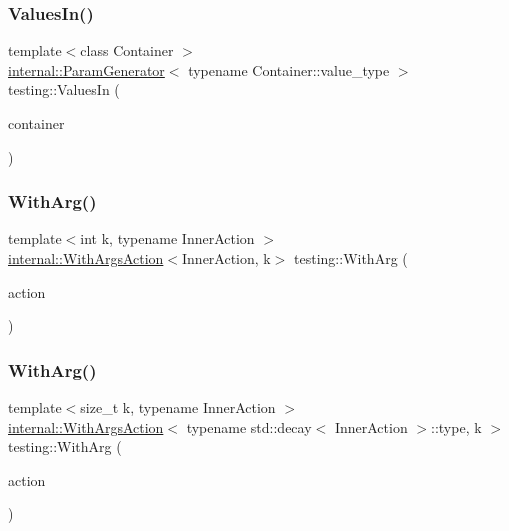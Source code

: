 \subsubsection{\texorpdfstring{ValuesIn()}{ValuesIn()}\hspace{0.1cm}{\footnotesize\ttfamily [3/3]}}
{\footnotesize\ttfamily template$<$class Container $>$ \\
\mbox{\hyperlink{classtesting_1_1internal_1_1_param_generator}{internal\+::\+Param\+Generator}}$<$ typename Container\+::value\+\_\+type $>$ testing\+::\+Values\+In (\begin{DoxyParamCaption}\item[{const Container \&}]{container }\end{DoxyParamCaption})}

\mbox{\label{namespacetesting_af76590c6cecc621e1ab4b681a9ea209b}} 
\subsubsection{\texorpdfstring{WithArg()}{WithArg()}\hspace{0.1cm}{\footnotesize\ttfamily [1/2]}}
{\footnotesize\ttfamily template$<$int k, typename Inner\+Action $>$ \\
\mbox{\hyperlink{structtesting_1_1internal_1_1_with_args_action}{internal\+::\+With\+Args\+Action}}$<$Inner\+Action, k$>$ testing\+::\+With\+Arg (\begin{DoxyParamCaption}\item[{const Inner\+Action \&}]{action }\end{DoxyParamCaption})\hspace{0.3cm}{\ttfamily [inline]}}

\mbox{\label{namespacetesting_ab27beef02a13e44e0448b9c50e763e0b}} 
\subsubsection{\texorpdfstring{WithArg()}{WithArg()}\hspace{0.1cm}{\footnotesize\ttfamily [2/2]}}
{\footnotesize\ttfamily template$<$size\+\_\+t k, typename Inner\+Action $>$ \\
\mbox{\hyperlink{structtesting_1_1internal_1_1_with_args_action}{internal\+::\+With\+Args\+Action}}$<$ typename std\+::decay$<$ Inner\+Action $>$\+::type, k $>$ testing\+::\+With\+Arg (\begin{DoxyParamCaption}\item[{Inner\+Action \&\&}]{action }\end{DoxyParamCaption})}

